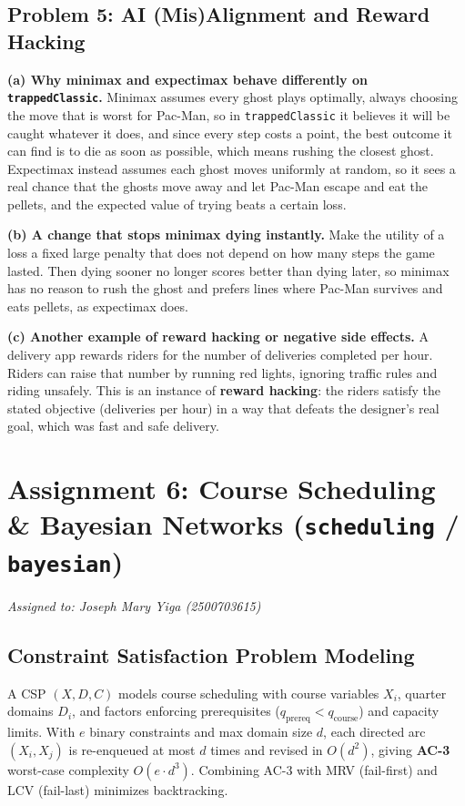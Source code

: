 \documentclass[11pt,a4paper]{article}
\begin{document}
\subsection{Problem 5: AI (Mis)Alignment and Reward Hacking}
\noindent\textbf{(a) Why minimax and expectimax behave differently on \texttt{trappedClassic}.}
Minimax assumes every ghost plays optimally, always choosing the move that is worst for Pac-Man, so in \texttt{trappedClassic} it believes it will be caught whatever it does, and since every step costs a point, the best outcome it can find is to die as soon as possible, which means rushing the closest ghost. Expectimax instead assumes each ghost moves uniformly at random, so it sees a real chance that the ghosts move away and let Pac-Man escape and eat the pellets, and the expected value of trying beats a certain loss.

\medskip
\noindent\textbf{(b) A change that stops minimax dying instantly.}
Make the utility of a loss a fixed large penalty that does not depend on how many steps the game lasted. Then dying sooner no longer scores better than dying later, so minimax has no reason to rush the ghost and prefers lines where Pac-Man survives and eats pellets, as expectimax does.

\medskip
\noindent\textbf{(c) Another example of reward hacking or negative side effects.}
A delivery app rewards riders for the number of deliveries completed per hour. Riders can raise that number by running red lights, ignoring traffic rules and riding unsafely. This is an instance of \textbf{reward hacking}: the riders satisfy the stated objective (deliveries per hour) in a way that defeats the designer's real goal, which was fast and safe delivery.

\section{Assignment 6: Course Scheduling \& Bayesian Networks (\texttt{scheduling} / \texttt{bayesian})}
\textit{Assigned to: Joseph Mary Yiga (2500703615)}

\subsection{Constraint Satisfaction Problem Modeling}
A CSP $(X, D, C)$ models course scheduling with course variables $X_i$, quarter domains $D_i$, and factors enforcing prerequisites ($q_{\text{prereq}} < q_{\text{course}}$) and capacity limits. With $e$ binary constraints and max domain size $d$, each directed arc $(X_i, X_j)$ is re-enqueued at most $d$ times and revised in $O(d^2)$, giving \textbf{AC-3} worst-case complexity $O(e \cdot d^3)$. Combining AC-3 with MRV (fail-first) and LCV (fail-last) minimizes backtracking.
\end{document}
